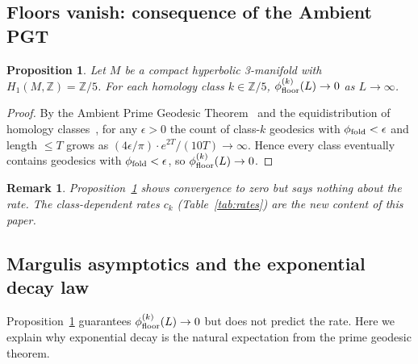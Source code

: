 \documentclass[12pt,a4paper]{article}
\newtheorem{proposition}{Proposition}
\newtheorem{remark}{Remark}
\begin{document}
\subsection{Floors vanish: consequence of the Ambient PGT}
\label{sec:floors_zero}

\begin{proposition}
\label{prop:floors_zero}
Let $M$ be a compact hyperbolic 3-manifold with
$H_1(M,\mathbb{Z})=\mathbb{Z}/5$.
For each homology class $k\in\mathbb{Z}/5$,
$\phi_{\rm floor}^{(k)}(L)\to 0$ as $L\to\infty$.
\end{proposition}

\begin{proof}
By the Ambient Prime Geodesic Theorem~\cite{BalogBiggs23} and the
equidistribution of homology classes~\cite{Sunada85}, for any
$\epsilon>0$ the count of class-$k$ geodesics with $\phi_{\rm fold}<\epsilon$
and length $\leq T$ grows as $(4\epsilon/\pi)\cdot e^{2T}/(10T)\to\infty$.
Hence every class eventually contains geodesics with
$\phi_{\rm fold}<\epsilon$, so $\phi_{\rm floor}^{(k)}(L)\to 0$.
\end{proof}

\begin{remark}
Proposition~\ref{prop:floors_zero} shows convergence to zero but
says nothing about the rate. The class-dependent rates $c_k$
(Table~\ref{tab:rates}) are the new content of this paper.
\end{remark}

\subsection{Margulis asymptotics and the exponential decay law}
\label{sec:margulis}

Proposition~\ref{prop:floors_zero} guarantees $\phi_{\rm floor}^{(k)}(L)\to 0$
but does not predict the rate.  Here we explain why exponential decay
is the natural expectation from the prime geodesic theorem.
\end{document}
